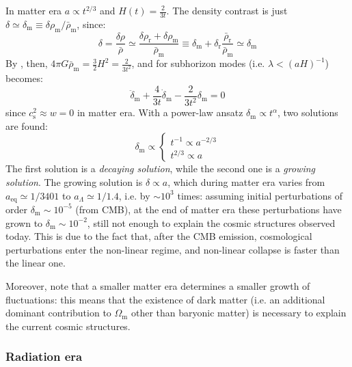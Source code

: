 In matter era $ a \propto t^{2/3} $ and $ H(t) = \frac{2}{3t} $. The density contrast is just $ \delta \simeq \delta_\text{m} \equiv \delta \rho_\text{m} / \bar{\rho}_\text{m} $, since:
\begin{equation*}
  \delta = \frac{\delta \rho}{\bar \rho} \simeq \frac{\delta \rho_\text{r} + \delta \rho_\text{m}}{\bar{\rho}_\text{m}} \equiv \delta_\text{m} + \delta_\text{r} \frac{\bar{\rho}_\text{r}}{\bar{\rho}_\text{m}} \simeq \delta_\text{m}
\end{equation*}
By , then, $ 4\pi G \bar{\rho}_\text{m} = \frac{3}{2} H^2 = \frac{2}{3t^2} $, and  for subhorizon modes (i.e. $ \lambda < (aH)^{-1} $) becomes:
\begin{equation}
  \ddot{\delta}_\text{m} + \frac{4}{3t} \dot{\delta}_\text{m} - \frac{2}{3t^2} \delta_\text{m} = 0
\end{equation}
since $ c_\text{s}^2 \approx w = 0 $ in matter era. With a power-law ansatz $ \delta_\text{m} \propto t^\alpha $, two solutions are found:
\begin{equation}
  \delta_\text{m} \propto
  \begin{cases}
    t^{-1} \propto a^{-2/3} \\
    t^{2/3} \propto a
  \end{cases}
\end{equation}
The first solution is a \emph{decaying solution}, while the second one is a \emph{growing solution}. The growing solution is $ \delta \propto a $, which during matter era varies from $ a_\text{eq} \simeq 1/3401 $ to $ a_\Lambda \simeq 1/1.4 $, i.e. by $ \sim 10^3 $ times: assuming initial perturbations of order $ \delta_\text{m} \sim 10^{-5} $ (from CMB), at the end of matter era these perturbations have grown to $ \delta_\text{m} \sim 10^{-2} $, still not enough to explain the cosmic structures observed today. This is due to the fact that, after the CMB emission, cosmological perturbations enter the non-linear regime, and non-linear collapse is faster than the linear one.

Moreover, note that a smaller matter era determines a smaller growth of fluctuations: this means that the existence of dark matter (i.e. an additional dominant contribution to $ \Omega_\text{m} $ other than baryonic matter) is necessary to explain the current cosmic structures.

\subsubsection{Radiation era}

